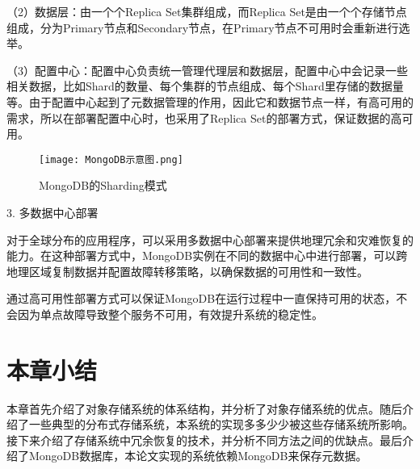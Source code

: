 （2）数据层：由一个个Replica Set集群组成，而Replica Set是由一个个存储节点组成，分为Primary节点和Secondary节点，在Primary节点不可用时会重新进行选举。

（3）配置中心：配置中心负责统一管理代理层和数据层，配置中心中会记录一些相关数据，比如Shard的数量、每个集群的节点组成、每个Shard里存储的数据量等。由于配置中心起到了元数据管理的作用，因此它和数据节点一样，有高可用的需求，所以在部署配置中心时，也采用了Replica Set的部署方式，保证数据的高可用。

\begin{figure}[h]
    \centering
    \texttt{[image: MongoDB示意图.png]}
    \caption{MongoDB的Sharding模式}
\end{figure}

3. 多数据中心部署

对于全球分布的应用程序，可以采用多数据中心部署来提供地理冗余和灾难恢复的能力。在这种部署方式中，MongoDB实例在不同的数据中心中进行部署，可以跨地理区域复制数据并配置故障转移策略，以确保数据的可用性和一致性。

通过高可用性部署方式可以保证MongoDB在运行过程中一直保持可用的状态，不会因为单点故障导致整个服务不可用，有效提升系统的稳定性。

\section{本章小结}%
本章首先介绍了对象存储系统的体系结构，并分析了对象存储系统的优点。随后介绍了一些典型的分布式存储系统，本系统的实现多多少少被这些存储系统所影响。接下来介绍了存储系统中冗余恢复的技术，并分析不同方法之间的优缺点。最后介绍了MongoDB数据库，本论文实现的系统依赖MongoDB来保存元数据。
